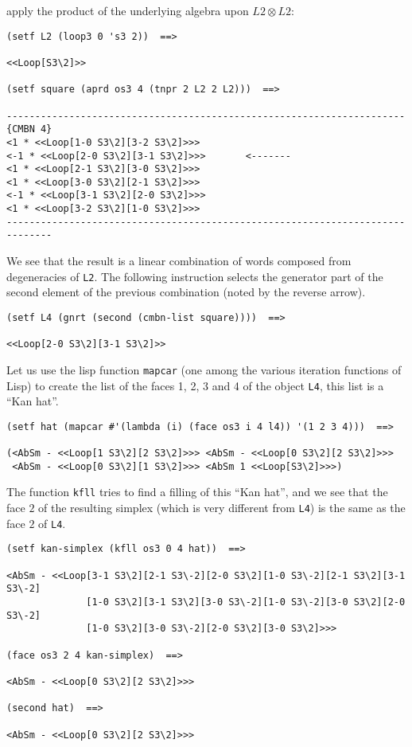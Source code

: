 apply the product of the underlying algebra upon $L2 \otimes L2$:
{\footnotesize\begin{verbatim}
(setf L2 (loop3 0 's3 2))  ==>

<<Loop[S3\2]>>

(setf square (aprd os3 4 (tnpr 2 L2 2 L2)))  ==>

----------------------------------------------------------------------{CMBN 4}
<1 * <<Loop[1-0 S3\2][3-2 S3\2]>>>
<-1 * <<Loop[2-0 S3\2][3-1 S3\2]>>>       <-------
<1 * <<Loop[2-1 S3\2][3-0 S3\2]>>>
<1 * <<Loop[3-0 S3\2][2-1 S3\2]>>>
<-1 * <<Loop[3-1 S3\2][2-0 S3\2]>>>
<1 * <<Loop[3-2 S3\2][1-0 S3\2]>>>
------------------------------------------------------------------------------
\end{verbatim}}
We see that the result is a linear combination of words composed from degeneracies
of {\tt L2}. The following instruction selects the generator part of the
second element of the previous combination (noted by the reverse arrow).
{\footnotesize\begin{verbatim}
(setf L4 (gnrt (second (cmbn-list square))))  ==>

<<Loop[2-0 S3\2][3-1 S3\2]>>
\end{verbatim}}
Let us use the lisp function {\tt mapcar} (one among the various iteration functions of Lisp) to
create the list of the faces 1, 2, 3 and 4 of the object {\tt L4}, this list is a ``Kan hat''.
{\footnotesize\begin{verbatim}
(setf hat (mapcar #'(lambda (i) (face os3 i 4 l4)) '(1 2 3 4)))  ==>

(<AbSm - <<Loop[1 S3\2][2 S3\2]>>> <AbSm - <<Loop[0 S3\2][2 S3\2]>>>
 <AbSm - <<Loop[0 S3\2][1 S3\2]>>> <AbSm 1 <<Loop[S3\2]>>>)
\end{verbatim}}
The function {\tt kfll} tries to find a filling of this ``Kan hat'', and we see that
the face $2$ of the resulting simplex (which is very different from {\tt L4}) is  the same
as the face $2$ of {\tt L4}.
{\footnotesize\begin{verbatim}
(setf kan-simplex (kfll os3 0 4 hat))  ==>

<AbSm - <<Loop[3-1 S3\2][2-1 S3\-2][2-0 S3\2][1-0 S3\-2][2-1 S3\2][3-1 S3\-2]
              [1-0 S3\2][3-1 S3\2][3-0 S3\-2][1-0 S3\-2][3-0 S3\2][2-0 S3\-2]
              [1-0 S3\2][3-0 S3\-2][2-0 S3\2][3-0 S3\2]>>>

(face os3 2 4 kan-simplex)  ==>

<AbSm - <<Loop[0 S3\2][2 S3\2]>>>

(second hat)  ==>

<AbSm - <<Loop[0 S3\2][2 S3\2]>>>
\end{verbatim}}
